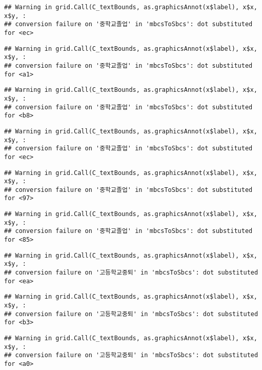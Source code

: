 \documentclass[
]{article}
\begin{document}
\begin{verbatim}
## Warning in grid.Call(C_textBounds, as.graphicsAnnot(x$label), x$x, x$y, :
## conversion failure on '중학교졸업' in 'mbcsToSbcs': dot substituted for <ec>
\end{verbatim}

\begin{verbatim}
## Warning in grid.Call(C_textBounds, as.graphicsAnnot(x$label), x$x, x$y, :
## conversion failure on '중학교졸업' in 'mbcsToSbcs': dot substituted for <a1>
\end{verbatim}

\begin{verbatim}
## Warning in grid.Call(C_textBounds, as.graphicsAnnot(x$label), x$x, x$y, :
## conversion failure on '중학교졸업' in 'mbcsToSbcs': dot substituted for <b8>
\end{verbatim}

\begin{verbatim}
## Warning in grid.Call(C_textBounds, as.graphicsAnnot(x$label), x$x, x$y, :
## conversion failure on '중학교졸업' in 'mbcsToSbcs': dot substituted for <ec>
\end{verbatim}

\begin{verbatim}
## Warning in grid.Call(C_textBounds, as.graphicsAnnot(x$label), x$x, x$y, :
## conversion failure on '중학교졸업' in 'mbcsToSbcs': dot substituted for <97>
\end{verbatim}

\begin{verbatim}
## Warning in grid.Call(C_textBounds, as.graphicsAnnot(x$label), x$x, x$y, :
## conversion failure on '중학교졸업' in 'mbcsToSbcs': dot substituted for <85>
\end{verbatim}

\begin{verbatim}
## Warning in grid.Call(C_textBounds, as.graphicsAnnot(x$label), x$x, x$y, :
## conversion failure on '고등학교중퇴' in 'mbcsToSbcs': dot substituted for <ea>
\end{verbatim}

\begin{verbatim}
## Warning in grid.Call(C_textBounds, as.graphicsAnnot(x$label), x$x, x$y, :
## conversion failure on '고등학교중퇴' in 'mbcsToSbcs': dot substituted for <b3>
\end{verbatim}

\begin{verbatim}
## Warning in grid.Call(C_textBounds, as.graphicsAnnot(x$label), x$x, x$y, :
## conversion failure on '고등학교중퇴' in 'mbcsToSbcs': dot substituted for <a0>
\end{verbatim}
\end{document}
